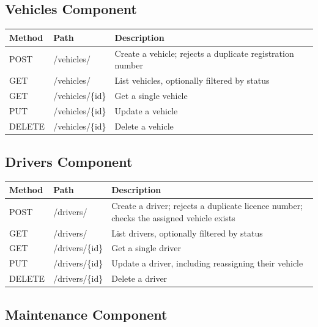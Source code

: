 \documentclass[11pt,a4paper]{article}
\begin{document}
\subsection{Vehicles Component}

\begin{table}[H]
\centering
\begin{tabularx}{\textwidth}{|p{2cm}|p{4cm}|X|}
\hline
\textbf{Method} & \textbf{Path} & \textbf{Description} \\
\hline
POST & /vehicles/ & Create a vehicle; rejects a duplicate registration number \\
\hline
GET & /vehicles/ & List vehicles, optionally filtered by status \\
\hline
GET & /vehicles/\{id\} & Get a single vehicle \\
\hline
PUT & /vehicles/\{id\} & Update a vehicle \\
\hline
DELETE & /vehicles/\{id\} & Delete a vehicle \\
\hline
\end{tabularx}
\end{table}

\subsection{Drivers Component}

\begin{table}[H]
\centering
\begin{tabularx}{\textwidth}{|p{2cm}|p{4cm}|X|}
\hline
\textbf{Method} & \textbf{Path} & \textbf{Description} \\
\hline
POST & /drivers/ & Create a driver; rejects a duplicate licence number; checks the assigned vehicle exists \\
\hline
GET & /drivers/ & List drivers, optionally filtered by status \\
\hline
GET & /drivers/\{id\} & Get a single driver \\
\hline
PUT & /drivers/\{id\} & Update a driver, including reassigning their vehicle \\
\hline
DELETE & /drivers/\{id\} & Delete a driver \\
\hline
\end{tabularx}
\end{table}

\subsection{Maintenance Component}
\end{document}
